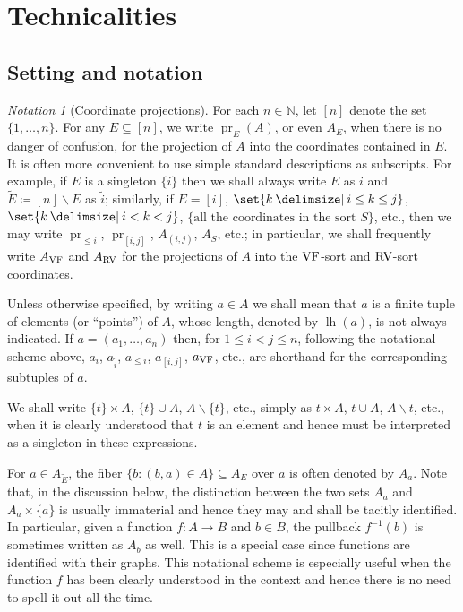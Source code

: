 \documentclass[12pt]{amsart}
\theoremstyle{plain}
\theoremstyle{definition}
\theoremstyle{remark}
\newtheorem{nota}[thm]{Notation}
\numberwithin{equation}{section}
\theoremstyle{plain}
\newcommand{\VF}{\textup{VF}}
\newcommand{\RV}{\textup{RV}}
\DeclareMathOperator{\lh}{lh}
\DeclareMathOperator{\pr}{pr}
\newcommand{\N}{\mathds{N}}
\newcommand{\0}{\emptyset}
\newcommand{\fun}{\longrightarrow}
\newcommand{\sub}{\subseteq}
\newcommand{\mi}{\smallsetminus}
\providecommand\given{}
\newcommand\SetSymbol[1][]{%
\nonscript \: #1 \vert
\allowbreak
\nonscript\:
\mathopen{}}
\renewcommand\given{\SetSymbol[\delimsize]}
\begin{document}
\section{Technicalities}
\label{sec-tech}

\subsection{Setting and notation}\label{sec:notation}

\begin{nota}[Coordinate projections]\label{indexing}
For each $n \in \N$, let $[n]$ denote the set $\{1, \ldots, n\}$. For any $E \sub [n]$, we write $\pr_E(A)$, or even $A_E$, when there is no danger of confusion, for the projection of $A$ into the coordinates contained in $E$. It is often more convenient to use simple standard descriptions as subscripts. For example, if $E$ is a singleton $\{i\}$ then we shall always write $E$ as $i$ and $\tilde E \coloneqq [n] \mi E$ as $\tilde i$; similarly, if $E = [i]$, $\set{k \given  i \leq k \leq j}$, $\set{k \given  i < k < j}$, $\{\text{all the coordinates in the sort $S$}\}$, etc., then we may write $\pr_{\leq i}$, $\pr_{[i, j]}$, $A_{(i, j)}$, $A_{S}$, etc.; in particular, we shall frequently write $A_{\VF}$ and $A_{\RV}$ for the projections of $A$ into the $\VF$-sort and $\RV$-sort coordinates.


Unless otherwise specified, by writing $a \in A$ we shall mean that $a$ is a finite tuple of elements (or ``points'') of $A$, whose length, denoted by $\lh(a)$, is not always indicated. If $a = (a_1, \ldots, a_n)$ then, for $1 \leq i < j \leq n$, following the notational scheme above, $a_i$, $a_{\tilde i}$, $a_{\leq i}$, $a_{[i, j]}$, $a_{\VF}$, etc., are shorthand for the corresponding subtuples of $a$.

We shall write $\{t\} \times A$, $\{t\} \cup A$, $A \mi \{t\}$, etc., simply as $t \times A$, $t \cup A$, $A \mi t$, etc., when it is clearly understood that $t$ is an element and hence must be interpreted as a singleton in these expressions.

For $a \in A_{\tilde E}$, the fiber $\{b : ( b, a) \in A \} \sub A_E$ over $a$ is often denoted by $A_a$. Note that, in the discussion below, the distinction between the two sets $A_a$ and $A_a \times \{a\}$ is usually immaterial and hence they may and  shall be tacitly identified. In particular, given a function $f : A \fun B$ and $b \in B$, the pullback $f^{-1}(b)$ is sometimes written as $A_b$ as well. This is a special case since functions are identified with their graphs. This notational scheme is especially useful when the function $f$ has been clearly understood in the context and hence there is no need to spell it out all the time.
\end{nota}
\end{document}
